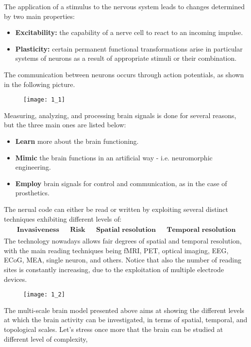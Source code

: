 The application of a stimulus to the nervous system leads to changes determined by
two main properties:
\begin{itemize}
    \item \textbf{Excitability:} the capability of a nerve cell to react to an
    incoming impulse.
    \item \textbf{Plasticity:} certain permanent functional transformations arise in
    particular systems of neurons as a result of appropriate stimuli or their
    combination.
\end{itemize}
The communication between neurons occurs through action potentials, as shown in the
following picture.
\begin{figure}[H]
    \texttt{[image: 1\_1]}
    \centering
\end{figure}
Measuring, analyzing, and processing brain signals is done for several reasons, but
the three main ones are listed below:
\begin{itemize}
    \item \textbf{Learn} more about the brain functioning.
    \item \textbf{Mimic} the brain functions in an artificial way - i.e. neuromorphic
    engineering.
    \item \textbf{Employ} brain signals for control and communication, as in the
    case of prosthetics.
\end{itemize}
The nerual code can either be read or written by exploiting several distinct
techniques exhibiting different levels of:
\begin{align*}
    \begin{matrix}
        \textbf{Invasiveness} && \textbf{Risk} &&
        \textbf{Spatial resolution} && \textbf{Temporal resolution}
    \end{matrix}
\end{align*}
The technology nowadays allows fair degrees of spatial and temporal resolution, with
the main reading techniques being fMRI, PET, optical imaging, EEG, ECoG, MEA,
single neuron, and others. Notice that also the number of reading sites is constantly increasing, due to the
exploitation of multiple electrode devices.
\begin{figure}[H]
    \texttt{[image: 1\_2]}
    \centering
\end{figure}
The multi-scale brain model presented above aims at showing the different levels at
which the brain activity can be investigated, in terms of spatial, temporal,
and topological scales.
Let's stress once more that the brain can be studied at different level of complexity,
